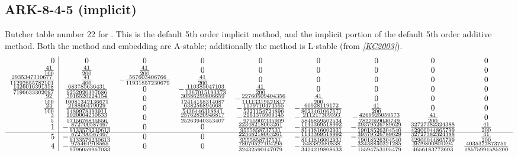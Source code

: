 \documentclass[letterpaper,10pt,english]{sphinxmanual}
\begin{document}
\subsection{ARK-8-4-5 (implicit)}
\label{Butcher:ark-8-4-5-implicit}\label{Butcher:butcher-ark-8-4-5-i}
Butcher table number 22
for {\hyperref[c_interface/User_callable:c.ARKodeSetIRKTableNum]{\emph{}}}.  This is
the default 5th order implicit method, and the implicit portion of the
default 5th order additive method.  Both the method and embedding are
A-stable; additionally the method is L-stable (from \label{Butcher:id21}{\hyperref[References:kc2003]{\emph{{[}KC2003{]}}}}).
\begin{gather}
\begin{split}\begin{array}{r|cccccccc}
  0 & 0 & 0 & 0 & 0 & 0 & 0 & 0 & 0 \\
  \frac{41}{100} & \frac{41}{200} & \frac{41}{200} & 0 & 0 & 0 & 0 & 0 & 0 \\
  \frac{2935347310677}{11292855782101} & \frac{41}{400} & -\frac{567603406766}{11931857230679} & \frac{41}{200} & 0 & 0 & 0 & 0 & 0 \\
  \frac{1426016391358}{7196633302097} & \frac{683785636431}{9252920307686} & 0 & -\frac{110385047103}{1367015193373} & \frac{41}{200} & 0 & 0 & 0 & 0 \\
  \frac{92}{100} & \frac{3016520224154}{10081342136671} & 0 & \frac{30586259806659}{12414158314087} & -\frac{22760509404356}{11113319521817} & \frac{41}{200} & 0 & 0 & 0 \\
  \frac{24}{100} & \frac{218866479029}{1489978393911} & 0 & \frac{638256894668}{5436446318841} & -\frac{1179710474555}{5321154724896} & -\frac{60928119172}{8023461067671} & \frac{41}{200} & 0 & 0 \\
  \frac{3}{5} & \frac{1020004230633}{5715676835656} & 0 & \frac{25762820946817}{25263940353407} & -\frac{2161375909145}{9755907335909} & -\frac{211217309593}{5846859502534} & -\frac{4269925059573}{7827059040749} & \frac{41}{200} & 0 \\
  1 & -\frac{872700587467}{9133579230613} & 0 & 0 & \frac{22348218063261}{9555858737531} & -\frac{1143369518992}{8141816002931} & -\frac{39379526789629}{19018526304540} & \frac{32727382324388}{42900044865799} & \frac{41}{200} \\
  \hline
  5 & -\frac{872700587467}{9133579230613} & 0 & 0 & \frac{22348218063261}{9555858737531} & -\frac{1143369518992}{8141816002931} & -\frac{39379526789629}{19018526304540} & \frac{32727382324388}{42900044865799} & \frac{41}{200} \\
  4 & -\frac{975461918565}{9796059967033} & 0 & 0 & \frac{78070527104295}{32432590147079} & -\frac{548382580838}{3424219808633} & -\frac{33438840321285}{15594753105479} & \frac{3629800801594}{4656183773603} & \frac{4035322873751}{18575991585200}
\end{array}\end{split}\notag
\end{gather}\begin{figure}[htbp]
\centering
\capstart


\end{figure}
\end{document}
